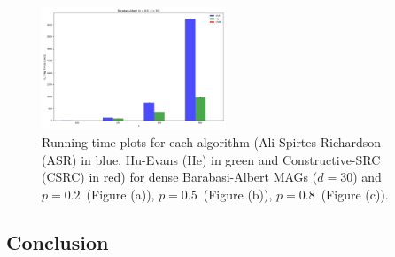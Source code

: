 \documentclass[a4paper]{article}
\begin{document}
\begin{figure}[htbp]
	\centering
	\hfill
	
	\includegraphics[width=0.49\textwidth]{figures/Figure_27.png}
	
	\caption{Running time plots for each algorithm (Ali-Spirtes-Richardson (ASR) in blue, Hu-Evans (He) in green and Constructive-SRC (CSRC) in red) for dense Barabasi-Albert MAGs ($d=30$) and $p=0.2$~(Figure (a)), $p=0.5$~(Figure (b)), $p=0.8$~(Figure (c)).}
	\label{fig:sf-30}
\end{figure}
\pagebreak
\subsection{Conclusion}
\end{document}
